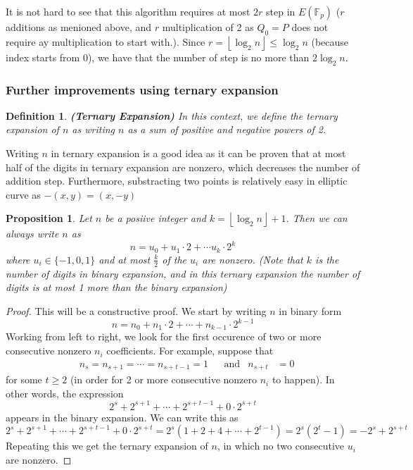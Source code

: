 \documentclass[a4 paper]{article}
\newcommand{\?}{\stackrel{?}{=}}
\newtheorem{definition}{Definition}[section]
\newtheorem{proposition}{Proposition}[theorem]
\begin{document}
It is not hard to see that this algorithm requires at most $ 2r $ step in $ E(\mathbb{F}_p) $ ($ r $ additions as menioned above, and $ r $ multiplication of 2 as $ Q_0 = P  $ does not require ay multiplication to start with.). Since $ r = \left\lfloor \log_2 n \right\rfloor \leq \log_2 n  $ (because index starts from 0), we have that the number of step is no more than $ \boxed{2\log_2 n} $.

\subsubsection{Further improvements using ternary expansion}

\begin{Definition}
\begin{definition}
\textbf{(Ternary Expansion)} In this context, we define the ternary expansion of $ n $ as writing $ n $ as a sum of positive and negative powers of 2.
\end{definition}
\end{Definition}

Writing $ n $ in ternary expansion is a good idea as it can be proven that at most half of the digits in ternary expansion are nonzero, which decreases the number of addition step. Furthermore, substracting two points is relatively easy in elliptic curve as $ -(x,y) = (x , -y) $ 

\begin{tcolorbox}
\begin{proposition}
Let $ n $ be a posiive integer and $ k = \left\lfloor \log_2 n   \right\rfloor +1   $. Then we can always write $ n $ as 
$$ n = u_0 + u_1 \cdot 2 + \cdots u_k \cdot 2^k $$
where $ u_i \in \{-1,0,1\} $ and at most $ \frac{k}{2} $ of the $ u_i $ are nonzero. (Note that $ k $ is the number of digits in binary expansion, and in this ternary expansion the number of digits is at most 1 more than the binary expansion)
\end{proposition} 
\end{tcolorbox}

\begin{tcolorbox}[breakable,colback=blue!5!white, colframe=blue!50!black]
\begin{proof}
This will be a constructive proof. We start by writing $ n $ in binary form 
$$ n = n_0 + n_1 \cdot 2 + \cdots + n_{k-1}\cdot 2^{k-1} $$
Working from left to right, we look for the first occurence of two or more consecutive nonzero $ n_i $ coefficients. For example, suppose that 
\begin{align*}
    &n_s = n_{s+1} = \cdots = n_{s+t-1} = 1 & &\text{and} & n_{s+t} &= 0
\end{align*}
for some $ t\geq 2  $ (in order for 2 or more consecutive nonzero $ n_i $ to happen). In other words, the expression
$$ 2^s + 2^{s+1}  +\cdots +2^{s+t-1}+ 0\cdot 2^{s+t} $$
appears in the binary expansion. We can write this as 
$$ 2^s + 2^{s+1}  +\cdots +2^{s+t-1}+ 0\cdot 2^{s+t} = 2^s (1 +2 +4 +\cdots + 2^{t-1}) = 2^s(2^t -1) = -2^s + 2^{s+t} $$
Repeating this we get the ternary expansion of $ n $, in which no two consecutive $ u_i $ are nonzero.
\end{proof}
\end{tcolorbox}
\end{document}

